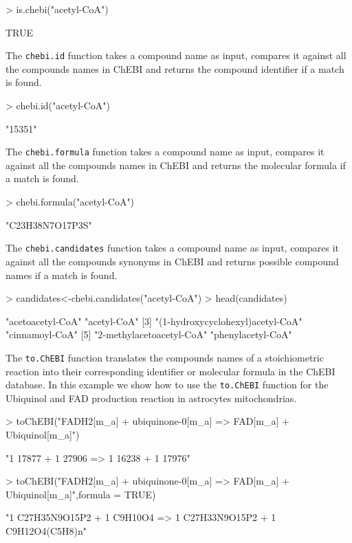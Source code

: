 \begin{Schunk}
\begin{Sinput}
> is.chebi("acetyl-CoA")
\end{Sinput}
\begin{Soutput}
[1] TRUE
\end{Soutput}
The \texttt{chebi.id} function takes a compound name as input, compares it against all the compounds names in ChEBI and returns the compound identifier if a match is found.
\begin{Sinput}
> chebi.id("acetyl-CoA")
\end{Sinput}
\begin{Soutput}
[1] "15351"
\end{Soutput}
The \texttt{chebi.formula} function takes a compound name as input, compares it against all the compounds names in ChEBI and returns the molecular formula if a match is found.
\begin{Sinput}
> chebi.formula("acetyl-CoA")
\end{Sinput}
\begin{Soutput}
[1] "C23H38N7O17P3S"
\end{Soutput}
The \texttt{chebi.candidates} function takes a compound name as input, compares it against all the compounds synonyms in ChEBI and returns possible compound names if a match is found.
\begin{Sinput}
> candidates<-chebi.candidates("acetyl-CoA")
> head(candidates)
\end{Sinput}
\begin{Soutput}
[1] "acetoacetyl-CoA"                 "acetyl-CoA"                     
[3] "(1-hydroxycyclohexyl)acetyl-CoA" "cinnamoyl-CoA"                  
[5] "2-methylacetoacetyl-CoA"         "phenylacetyl-CoA"               
\end{Soutput}
The \texttt{to.ChEBI} function translates the compounds names of a stoichiometric reaction into their corresponding identifier or molecular formula in the ChEBI database. In this example we show how to use the \texttt{to.ChEBI} function for the Ubiquinol and FAD production reaction in astrocytes mitochondrias.
\begin{Sinput}
> toChEBI("FADH2[m_a] + ubiquinone-0[m_a] => FAD[m_a] + Ubiquinol[m_a]")
\end{Sinput}
\begin{Soutput}
[1] "1 17877 + 1 27906 => 1 16238 + 1 17976"
\end{Soutput}
\begin{Sinput}
> toChEBI("FADH2[m_a] + ubiquinone-0[m_a] => FAD[m_a] + Ubiquinol[m_a]",formula = TRUE)
\end{Sinput}
\begin{Soutput}
[1] "1 C27H35N9O15P2 + 1 C9H10O4 => 1 C27H33N9O15P2 + 1 C9H12O4(C5H8)n"
\end{Soutput}
\end{Schunk}
